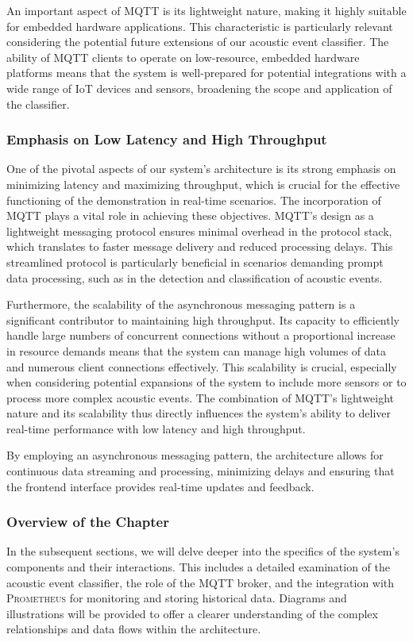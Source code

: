 An important aspect of MQTT is its lightweight nature, making it highly suitable for embedded hardware applications. This characteristic is particularly relevant considering the potential future extensions of our acoustic event classifier. The ability of MQTT clients to operate on low-resource, embedded hardware platforms means that the system is well-prepared for potential integrations with a wide range of IoT devices and sensors, broadening the scope and application of the classifier.

\subsubsection{Emphasis on Low Latency and High Throughput}
One of the pivotal aspects of our system's architecture is its strong emphasis on minimizing latency and maximizing throughput, which is crucial for the effective functioning of the demonstration in real-time scenarios. The incorporation of MQTT plays a vital role in achieving these objectives. MQTT's design as a lightweight messaging protocol ensures minimal overhead in the protocol stack, which translates to faster message delivery and reduced processing delays. This streamlined protocol is particularly beneficial in scenarios demanding prompt data processing, such as in the detection and classification of acoustic events.

Furthermore, the scalability of the asynchronous messaging pattern is a significant contributor to maintaining high throughput. Its capacity to efficiently handle large numbers of concurrent connections without a proportional increase in resource demands means that the system can manage high volumes of data and numerous client connections effectively. This scalability is crucial, especially when considering potential expansions of the system to include more sensors or to process more complex acoustic events. The combination of MQTT's lightweight nature and its scalability thus directly influences the system's ability to deliver real-time performance with low latency and high throughput.

By employing an asynchronous messaging pattern, the architecture allows for continuous data streaming and processing, minimizing delays and ensuring that the frontend interface provides real-time updates and feedback.

\subsubsection{Overview of the Chapter}
In the subsequent sections, we will delve deeper into the specifics of the system's components and their interactions. This includes a detailed examination of the acoustic event classifier, the role of the MQTT broker, and the integration with \textsc{Prometheus} for monitoring and storing historical data. Diagrams and illustrations will be provided to offer a clearer understanding of the complex relationships and data flows within the architecture.

